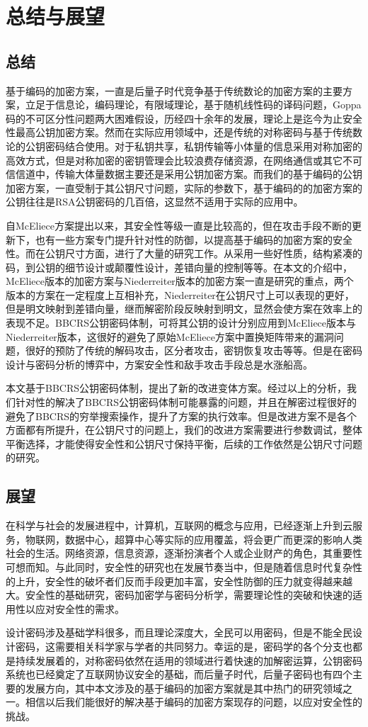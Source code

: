 \chapter{总结与展望}
\section{总结}
基于编码的加密方案，一直是后量子时代竞争基于传统数论的加密方案的主要方案，立足于信息论，编码理论，有限域理论，基于随机线性码的译码问题，Goppa码的不可区分性问题两大困难假设，历经四十余年的发展，理论上是迄今为止安全性最高公钥加密方案。然而在实际应用领域中，还是传统的对称密码与基于传统数论的公钥密码结合使用。对于私钥共享，私钥传输等小体量的信息采用对称加密的高效方式，但是对称加密的密钥管理会比较浪费存储资源，在网络通信或其它不可信信道中，传输大体量数据主要还是采用公钥加密方案。而我们的基于编码的公钥加密方案，一直受制于其公钥尺寸问题，实际的参数下，基于编码的的加密方案的公钥往往是RSA公钥密码的几百倍，这显然不适用于实际的应用中。

自McEliece方案提出以来，其安全性等级一直是比较高的，但在攻击手段不断的更新下，也有一些方案专门提升针对性的防御，以提高基于编码的加密方案的安全性。而在公钥尺寸方面，进行了大量的研究工作。从采用一些好性质，结构紧凑的码，到公钥的细节设计或颠覆性设计，差错向量的控制等等。在本文的介绍中，McEliece版本的加密方案与Niederreiter版本的加密方案一直是研究的重点，两个版本的方案在一定程度上互相补充，Niederreiter在公钥尺寸上可以表现的更好，但是明文映射到差错向量，继而解密阶段反映射到明文，显然会使方案在效率上的表现不足。BBCRS公钥密码体制，可将其公钥的设计分别应用到McEliece版本与Niederreiter版本，这很好的避免了原始McEliece方案中置换矩阵带来的漏洞问题，很好的预防了传统的解码攻击，区分者攻击，密钥恢复攻击等等。但是在密码设计与密码分析的博弈中，方案安全性和敌手攻击手段总是水涨船高。

本文基于BBCRS公钥密码体制，提出了新的改进变体方案。经过以上的分析，我们针对性的解决了BBCRS公钥密码体制可能暴露的问题，并且在解密过程很好的避免了BBCRS的穷举搜索操作，提升了方案的执行效率。但是改进方案不是各个方面都有所提升，在公钥尺寸的问题上，我们的改进方案需要进行参数调试，整体平衡选择，才能使得安全性和公钥尺寸保持平衡，后续的工作依然是公钥尺寸问题的研究。

\section{展望}
在科学与社会的发展进程中，计算机，互联网的概念与应用，已经逐渐上升到云服务，物联网，数据中心，超算中心等实际的应用覆盖，将会更广而更深的影响人类社会的生活。网络资源，信息资源，逐渐扮演者个人或企业财产的角色，其重要性可想而知。与此同时，安全性的研究也在发展节奏当中，但是随着信息时代复杂性的上升，安全性的破坏者们反而手段更加丰富，安全性防御的压力就变得越来越大。安全性的基础研究，密码加密学与密码分析学，需要理论性的突破和快速的适用性以应对安全性的需求。

设计密码涉及基础学科很多，而且理论深度大，全民可以用密码，但是不能全民设计密码，这需要相关科学家与学者的共同努力。幸运的是，密码学的各个分支也都是持续发展着的，对称密码依然在适用的领域进行着快速的加解密运算，公钥密码系统也已经奠定了互联网协议安全的基础，而后量子时代，后量子密码也有四个主要的发展方向，其中本文涉及的基于编码的加密方案就是其中热门的研究领域之一。相信以后我们能很好的解决基于编码的加密方案现存的问题，以应对安全性的挑战。